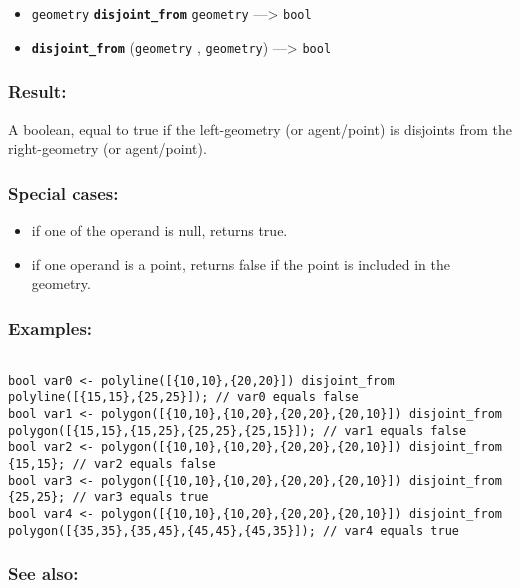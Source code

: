 \documentclass[]{book}
\providecommand{\tightlist}{%
  \setlength{\itemsep}{0pt}\setlength{\parskip}{0pt}}
\theoremstyle{definition}
\theoremstyle{definition}
\theoremstyle{definition}
\theoremstyle{remark}
\begin{document}
\begin{itemize}
\tightlist
\item
  \texttt{geometry} \textbf{\texttt{disjoint\_from}} \texttt{geometry}
  ---\textgreater{} \texttt{bool}
\item
  \textbf{\texttt{disjoint\_from}} (\texttt{geometry} ,
  \texttt{geometry}) ---\textgreater{} \texttt{bool}
\end{itemize}

\subsubsection{Result:}\label{result-130}

A boolean, equal to true if the left-geometry (or agent/point) is
disjoints from the right-geometry (or agent/point).

\subsubsection{Special cases:}\label{special-cases-50}

\begin{itemize}
\tightlist
\item
  if one of the operand is null, returns true.\\
\item
  if one operand is a point, returns false if the point is included in
  the geometry.
\end{itemize}

\subsubsection{Examples:}\label{examples-101}

\begin{verbatim}
 
bool var0 <- polyline([{10,10},{20,20}]) disjoint_from polyline([{15,15},{25,25}]); // var0 equals false 
bool var1 <- polygon([{10,10},{10,20},{20,20},{20,10}]) disjoint_from polygon([{15,15},{15,25},{25,25},{25,15}]); // var1 equals false 
bool var2 <- polygon([{10,10},{10,20},{20,20},{20,10}]) disjoint_from {15,15}; // var2 equals false 
bool var3 <- polygon([{10,10},{10,20},{20,20},{20,10}]) disjoint_from {25,25}; // var3 equals true 
bool var4 <- polygon([{10,10},{10,20},{20,20},{20,10}]) disjoint_from polygon([{35,35},{35,45},{45,45},{45,35}]); // var4 equals true
\end{verbatim}

\subsubsection{See also:}\label{see-also-79}
\end{document}

